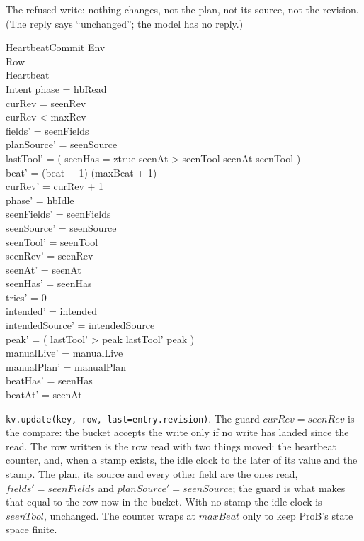 \documentclass[a4paper,10pt,fleqn]{article}
\begin{document}
The refused write: nothing changes, not the plan, not its source, not the
revision.  (The reply says ``unchanged''; the model has no reply.)

\begin{schema}{HeartbeatCommit}
  \Xi Env \\
  \Delta Row \\
  \Delta Heartbeat \\
  \Delta Intent
  \where
  phase = hbRead \\
  curRev = seenRev \\
  curRev < maxRev \\
  fields' = seenFields \\
  planSource' = seenSource \\
  lastTool' = ( \IF seenHas = ztrue \land seenAt > seenTool \THEN seenAt
    \ELSE seenTool ) \\
  beat' = (beat + 1) \mod (maxBeat + 1) \\
  curRev' = curRev + 1 \\
  phase' = hbIdle \\
  seenFields' = seenFields \\
  seenSource' = seenSource \\
  seenTool' = seenTool \\
  seenRev' = seenRev \\
  seenAt' = seenAt \\
  seenHas' = seenHas \\
  tries' = 0 \\
  intended' = intended \\
  intendedSource' = intendedSource \\
  peak' = ( \IF lastTool' > peak \THEN lastTool' \ELSE peak ) \\
  manualLive' = manualLive \\
  manualPlan' = manualPlan \\
  beatHas' = seenHas \\
  beatAt' = seenAt
\end{schema}

\texttt{kv.update(key, row, last=entry.revision)}.  The guard $curRev =
seenRev$ is the compare: the bucket accepts the write only if no write has
landed since the read.  The row written is the row read with two things
moved: the heartbeat counter, and, when a stamp exists, the idle clock to the
later of its value and the stamp.  The plan, its source and every other field
are the ones read, $fields' = seenFields$ and $planSource' = seenSource$; the
guard is what makes that equal to the row now in the bucket.  With no stamp the
idle clock is $seenTool$, unchanged.  The counter wraps at $maxBeat$ only to
keep ProB's state space finite.
\end{document}
